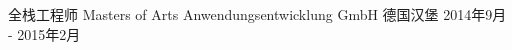\cventry
{全栈工程师} %
{Masters of Arts Anwendungsentwicklung GmbH} %
{德国汉堡} %
{2014年9月 - 2015年2月} %
{ %
}